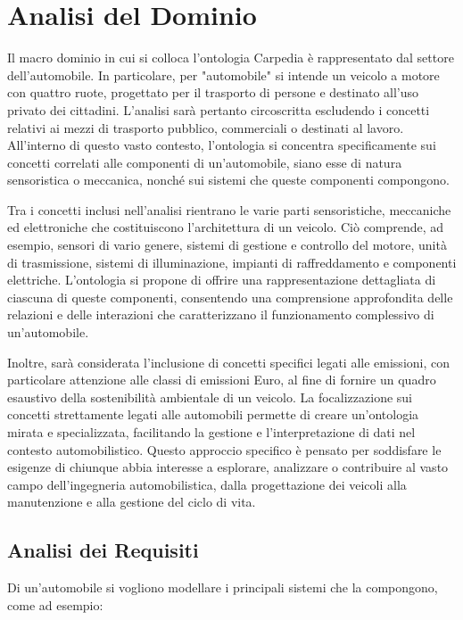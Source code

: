 \chapter{Analisi del Dominio}

Il macro dominio in cui si colloca l'ontologia Carpedia è rappresentato dal settore dell'automobile. In particolare, per "automobile" si intende un veicolo a motore con quattro ruote, progettato per il trasporto di persone e destinato all'uso privato dei cittadini. L'analisi sarà pertanto circoscritta escludendo i concetti relativi ai mezzi di trasporto pubblico, commerciali o destinati al lavoro. All'interno di questo vasto contesto, l'ontologia si concentra specificamente sui concetti correlati alle componenti di un'automobile, siano esse di natura sensoristica o meccanica, nonché sui sistemi che queste componenti compongono.

Tra i concetti inclusi nell'analisi rientrano le varie parti sensoristiche, meccaniche ed elettroniche che costituiscono l'architettura di un veicolo. Ciò comprende, ad esempio, sensori di vario genere, sistemi di gestione e controllo del motore, unità di trasmissione, sistemi di illuminazione, impianti di raffreddamento e componenti elettriche. L'ontologia si propone di offrire una rappresentazione dettagliata di ciascuna di queste componenti, consentendo una comprensione approfondita delle relazioni e delle interazioni che caratterizzano il funzionamento complessivo di un'automobile.

Inoltre, sarà considerata l'inclusione di concetti specifici legati alle emissioni, con particolare attenzione alle classi di emissioni Euro, al fine di fornire un quadro esaustivo della sostenibilità ambientale di un veicolo. La focalizzazione sui concetti strettamente legati alle automobili permette di creare un'ontologia mirata e specializzata, facilitando la gestione e l'interpretazione di dati nel contesto automobilistico. Questo approccio specifico è pensato per soddisfare le esigenze di chiunque abbia interesse a esplorare, analizzare o contribuire al vasto campo dell'ingegneria automobilistica, dalla progettazione dei veicoli alla manutenzione e alla gestione del ciclo di vita.

\section{Analisi dei Requisiti}
Di un'automobile si vogliono modellare i principali sistemi che la compongono, come ad esempio:

